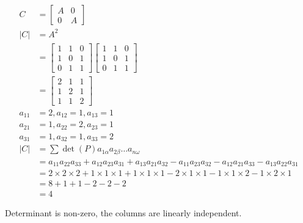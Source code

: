 \documentclass[main.tex]{subfiles}
\begin{document}
\begin{enumerate}
    $$
    \begin{aligned}
    C &=\left[\begin{array}{ll}
    A & 0 \\
    0 & A
    \end{array}\right] \\
    |C| &=A^{2} \\
    &=\left[\begin{array}{lll}
    1 & 1 & 0 \\
    1 & 0 & 1 \\
    0 & 1 & 1
    \end{array}\right]\left[\begin{array}{lll}
    1 & 1 & 0 \\
    1 & 0 & 1 \\
    0 & 1 & 1
    \end{array}\right] \\
    &=\left[\begin{array}{lll}
    2 & 1 & 1 \\
    1 & 2 & 1 \\
    1 & 1 & 2
    \end{array}\right]\\
    a_{11} &=2, a_{12}=1, a_{13}=1 \\
    a_{21} &=1, a_{22}=2, a_{23}=1 \\
    a_{31} &=1, a_{32}=1, a_{33}=2 \\
    |C|&=\sum \operatorname{det}(P) a_{1 \alpha} a_{2 \beta} \ldots a_{n \omega} \\
    &=a_{11} a_{22} a_{33}+a_{12} a_{23} a_{31}+a_{13} a_{21} a_{32}-a_{11} a_{23} a_{32}-a_{12} a_{21} a_{33}-a_{13} a_{22} a_{31} \\
    &=2 \times 2 \times 2+1 \times 1 \times 1+1 \times 1 \times 1-2 \times 1 \times 1-1 \times 1 \times 2-1 \times 2 \times 1 \\
    &=8+1+1-2-2-2 \\
    &=4
    \end{aligned}
    $$
    
    Determinant is non-zero, the columns are linearly independent.
    

\end{enumerate}
\end{document}
